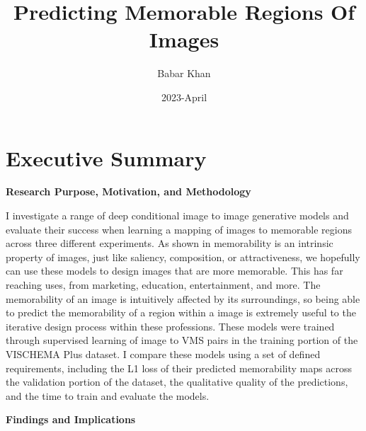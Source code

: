 \documentclass{UoYCSproject}
\author{Babar Khan}
\title{Predicting Memorable Regions Of Images}
\date{2023-April}
\begin{document}
\maketitle

\chapter{Executive Summary}




\textbf{Research Purpose, Motivation, and Methodology}

I investigate a range of deep conditional image to image generative models and evaluate their success when learning a mapping of images to memorable regions across three different experiments. 
As shown in \cite{Isola2011,IsolaParikhTorralbaOliva2011,isola2014memorability}
memorability is an intrinsic property of images, just like saliency, composition, or attractiveness, we hopefully can use these models to design images that are more memorable. This has far reaching uses, from marketing, education, entertainment, and more. The memorability of an image is intuitively affected by its surroundings, so being able to predict the memorability of a region within a image is extremely useful to the iterative design process within these professions.  
These models were trained through supervised learning of image to VMS pairs in the training portion of the VISCHEMA Plus dataset. I compare these models using a set of defined requirements, including the L1 loss of their predicted memorability maps across the validation portion of the dataset, the qualitative quality of the predictions, and the time to train and evaluate the models.

\textbf{Findings and Implications}
\end{document}
